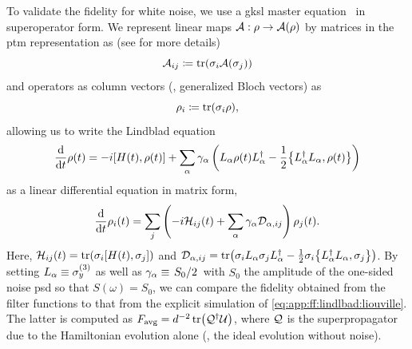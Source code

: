 To validate the fidelity for white noise, we use a \gls{gksl} master equation~\cite{Lindblad1976,Gorini1976} in superoperator form.
We represent linear maps $\mathcal{A}: \rho\rightarrow\mathcal{A}(\rho)$ by matrices in the \gls{ptm} representation as (see  for more details)
\begin{equation}
    \mathcal{A}_{ij} \coloneqq \tr(\sigma_i\mathcal{A}(\sigma_j))
\end{equation}
and operators as column vectors (\ie, generalized Bloch vectors) as
\begin{equation}\label{eq:app:ff:bloch_vector}
    \rho_i \coloneqq \tr(\sigma_i\rho),
\end{equation}
allowing us to write the Lindblad equation
\begin{equation}\label{eq:app:ff:lindblad:hilbert}
    \dv{t}\rho(t) = -\i\comm{H(t)}{\rho(t)} + \sum_\alpha \gamma_\alpha\left(L_\alpha\rho(t) L_\alpha\adjoint - \frac{1}{2}\acomm{L_\alpha\adjoint L_\alpha}{\rho(t)}\right)
\end{equation}
as a linear differential equation in matrix form,
\begin{equation}\label{eq:app:ff:lindlbad:liouville}
    \dv{t}\rho_i(t) = \sum_j\left(-i\mathcal{H}_{ij}(t)+ \sum_\alpha \gamma_\alpha \mathcal{D}_{\alpha, ij}\right)\rho_j(t).
\end{equation}
Here, $\mc{H}_{ij}(t) = \tr(\sigma_i\comm{H(t)}{\sigma_j})$ and $\mc{D}_{\alpha, ij} = \tr(\sigma_i L_\alpha\sigma_j L_\alpha\adjoint - \frac{1}{2}\sigma_i \acomm{L_\alpha\adjoint L_\alpha}{\sigma_j})$.
By setting $L_\alpha\equiv\sigma_y^{(3)}$ as well as $\gamma_\alpha\equiv\flatfrac{S_0}{2}$ with $S_0$ the amplitude of the one-sided noise \gls{psd} so that $S(\omega) = S_0$, we can compare the fidelity obtained from the filter functions to that from the explicit simulation of \cref{eq:app:ff:lindlbad:liouville}.
The latter is computed as $F_{\mathrm{avg}} = d^{-2}\tr(\mathcal{Q}^\dagger\mathcal{U})$, where $\mathcal{Q}$ is the superpropagator due to the Hamiltonian evolution alone (\ie, the ideal evolution without noise).


